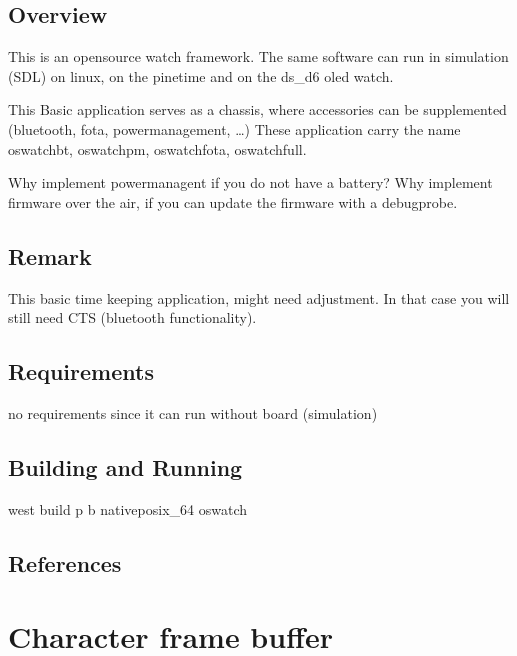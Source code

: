 \documentclass[letterpaper,10pt,english]{sphinxmanual}
\begin{document}
\subsection{Overview}
\label{\detokenize{samples/apposwatchREADME:overview}}
This is an opensource watch framework.
The same software can run in simulation (SDL) on linux, on the pinetime and on the ds\_d6 oled watch.

This Basic application serves as a chassis, where accessories can be supplemented (bluetooth, fota, powermanagement, …)
These application carry the name oswatch\sphinxhyphen{}bt, oswatch\sphinxhyphen{}pm, oswatch\sphinxhyphen{}fota, oswatch\sphinxhyphen{}full.

Why implement powermanagent if you do not have a battery?
Why implement firmware over the air, if you can update the firmware with a debugprobe.


\subsection{Remark}
\label{\detokenize{samples/apposwatchREADME:remark}}
This basic time keeping application, might need adjustment.
In that case you will still need CTS (bluetooth functionality).


\subsection{Requirements}
\label{\detokenize{samples/apposwatchREADME:requirements}}
no requirements since it can run without board (simulation)


\subsection{Building and Running}
\label{\detokenize{samples/apposwatchREADME:building-and-running}}
west build \sphinxhyphen{}p \sphinxhyphen{}b  native\sphinxhyphen{}posix\_64 oswatch


\subsection{References}
\label{\detokenize{samples/apposwatchREADME:references}}

\section{Character frame buffer}
\label{\detokenize{samples/appsamplescfbREADME:character-frame-buffer}}\label{\detokenize{samples/appsamplescfbREADME:character-frame-buffer-sample}}\label{\detokenize{samples/appsamplescfbREADME::doc}}
\end{document}
